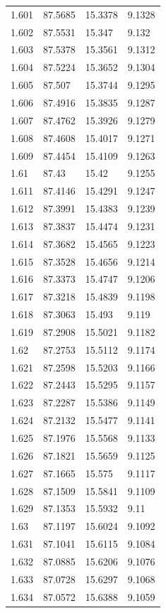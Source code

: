 \begin{tabular}{llll}
1.601 & 87.5685 & 15.3378 & 9.1328 \\
1.602 & 87.5531 & 15.347 & 9.132 \\
1.603 & 87.5378 & 15.3561 & 9.1312 \\
1.604 & 87.5224 & 15.3652 & 9.1304 \\
1.605 & 87.507 & 15.3744 & 9.1295 \\
1.606 & 87.4916 & 15.3835 & 9.1287 \\
1.607 & 87.4762 & 15.3926 & 9.1279 \\
1.608 & 87.4608 & 15.4017 & 9.1271 \\
1.609 & 87.4454 & 15.4109 & 9.1263 \\
1.61 & 87.43 & 15.42 & 9.1255 \\
1.611 & 87.4146 & 15.4291 & 9.1247 \\
1.612 & 87.3991 & 15.4383 & 9.1239 \\
1.613 & 87.3837 & 15.4474 & 9.1231 \\
1.614 & 87.3682 & 15.4565 & 9.1223 \\
1.615 & 87.3528 & 15.4656 & 9.1214 \\
1.616 & 87.3373 & 15.4747 & 9.1206 \\
1.617 & 87.3218 & 15.4839 & 9.1198 \\
1.618 & 87.3063 & 15.493 & 9.119 \\
1.619 & 87.2908 & 15.5021 & 9.1182 \\
1.62 & 87.2753 & 15.5112 & 9.1174 \\
1.621 & 87.2598 & 15.5203 & 9.1166 \\
1.622 & 87.2443 & 15.5295 & 9.1157 \\
1.623 & 87.2287 & 15.5386 & 9.1149 \\
1.624 & 87.2132 & 15.5477 & 9.1141 \\
1.625 & 87.1976 & 15.5568 & 9.1133 \\
1.626 & 87.1821 & 15.5659 & 9.1125 \\
1.627 & 87.1665 & 15.575 & 9.1117 \\
1.628 & 87.1509 & 15.5841 & 9.1109 \\
1.629 & 87.1353 & 15.5932 & 9.11 \\
1.63 & 87.1197 & 15.6024 & 9.1092 \\
1.631 & 87.1041 & 15.6115 & 9.1084 \\
1.632 & 87.0885 & 15.6206 & 9.1076 \\
1.633 & 87.0728 & 15.6297 & 9.1068 \\
1.634 & 87.0572 & 15.6388 & 9.1059 \\

\end{tabular}
